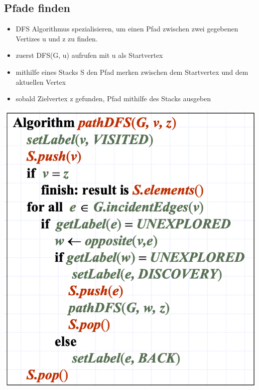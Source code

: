 \subsection{Pfade finden}
\begin{itemize}
    \item DFS Algorithmus spezialisieren, um einen Pfad zwischen zwei gegebenen Vertizes u und z zu finden.
    \item zuerst DFS(G, u) aufrufen mit u als Startvertex
    \item mithilfe eines Stacks S den Pfad merken zwischen dem Startvertex und dem aktuellen Vertex
    \item sobald Zielvertex z gefunden, Pfad mithilfe des Stacks ausgeben
\end{itemize}
\vspace{-8pt}
\begin{center}
    \includegraphics[scale=.3]{graphic/12 DFS/Pfade finden.png}
\end{center}
\vspace{-8pt}


